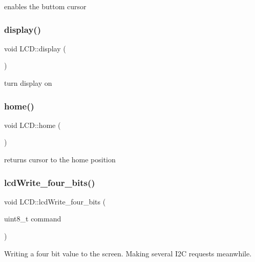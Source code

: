 enables the buttom cursor 

\mbox{\label{class_l_c_d_a5b07cf05e8e5e7c53654f5ca0cf58b89}} 
\subsubsection{\texorpdfstring{display()}{display()}}
{\footnotesize\ttfamily void L\+C\+D\+::display (\begin{DoxyParamCaption}{ }\end{DoxyParamCaption})}



turn display on 

\mbox{\label{class_l_c_d_aee45ad37f09312f5d9982257e2d37e68}} 
\subsubsection{\texorpdfstring{home()}{home()}}
{\footnotesize\ttfamily void L\+C\+D\+::home (\begin{DoxyParamCaption}{ }\end{DoxyParamCaption})}



returns cursor to the home position 

\mbox{\label{class_l_c_d_a3936d094c35e80038c68c94d1acee71d}} 
\subsubsection{\texorpdfstring{lcd\+Write\+\_\+four\+\_\+bits()}{lcdWrite\_four\_bits()}}
{\footnotesize\ttfamily void L\+C\+D\+::lcd\+Write\+\_\+four\+\_\+bits (\begin{DoxyParamCaption}\item[{uint8\+\_\+t}]{command }\end{DoxyParamCaption})}



Writing a four bit value to the screen. Making several I2C requests meanwhile. 

\mbox{\label{class_l_c_d_a3b755c4b397b5985752be8c30ee1a9b5}} 
